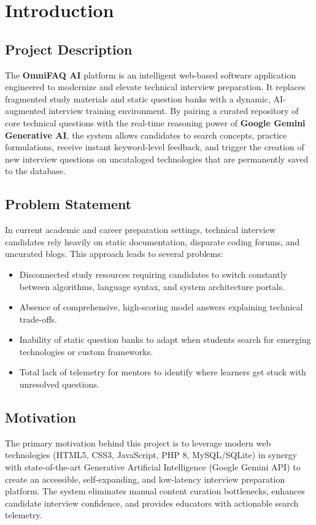 \chapter{Introduction}

\section{Project Description}
The \textbf{OmniFAQ AI} platform is an intelligent web-based software application engineered to modernize and elevate technical interview preparation. It replaces fragmented study materials and static question banks with a dynamic, AI-augmented interview training environment. By pairing a curated repository of core technical questions with the real-time reasoning power of \textbf{Google Gemini Generative AI}, the system allows candidates to search concepts, practice formulations, receive instant keyword-level feedback, and trigger the creation of new interview questions on uncataloged technologies that are permanently saved to the database.

\section{Problem Statement}
In current academic and career preparation settings, technical interview candidates rely heavily on static documentation, disparate coding forums, and uncurated blogs. This approach leads to several problems:
\begin{itemize}
    \item Disconnected study resources requiring candidates to switch constantly between algorithms, language syntax, and system architecture portals.
    \item Absence of comprehensive, high-scoring model answers explaining technical trade-offs.
    \item Inability of static question banks to adapt when students search for emerging technologies or custom frameworks.
    \item Total lack of telemetry for mentors to identify where learners get stuck with unresolved questions.
\end{itemize}

\section{Motivation}
The primary motivation behind this project is to leverage modern web technologies (HTML5, CSS3, JavaScript, PHP 8, MySQL/SQLite) in synergy with state-of-the-art Generative Artificial Intelligence (Google Gemini API) to create an accessible, self-expanding, and low-latency interview preparation platform. The system eliminates manual content curation bottlenecks, enhances candidate interview confidence, and provides educators with actionable search telemetry.

